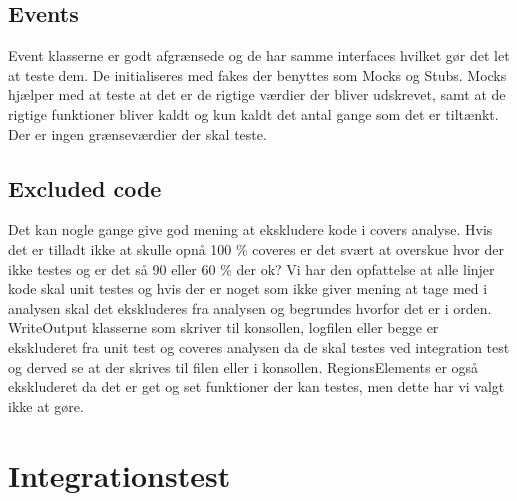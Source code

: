 \subsection{Events}
Event klasserne er godt afgrænsede og de har samme interfaces hvilket gør det let at teste dem. De initialiseres med fakes der benyttes som Mocks og Stubs. Mocks hjælper med at teste at det er de rigtige værdier der bliver udskrevet, samt at de rigtige funktioner bliver kaldt og kun kaldt det antal gange som det er tiltænkt. Der er ingen grænseværdier der skal teste.

\subsection{Excluded code}
Det kan nogle gange give god mening at ekskludere kode i covers analyse. Hvis det er tilladt ikke at skulle opnå 100 \% coveres er det svært at overskue hvor der ikke testes og er det så 90 eller 60 \% der ok? Vi har den opfattelse at alle linjer kode skal unit testes og hvis der er noget som ikke giver mening at tage med i analysen skal det ekskluderes fra analysen og begrundes hvorfor det er i orden.
WriteOutput klasserne som skriver til konsollen, logfilen eller begge er ekskluderet fra unit test og coveres analysen da de skal testes ved integration test og derved se at der skrives til filen eller i konsollen. 
RegionsElements er også ekskluderet da det er get og set funktioner der kan testes, men dette har vi valgt ikke at gøre.

\section{Integrationstest}

